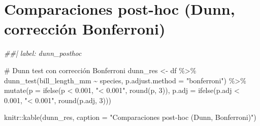 \documentclass[
  spanish,
  11pt,
  a4paper,
  DIV=11,
  numbers=noendperiod]{scrartcl}
\newenvironment{Shaded}{\begin{snugshade}}{\end{snugshade}}
\newcommand{\AttributeTok}[1]{\textcolor[rgb]{0.40,0.45,0.13}{#1}}
\newcommand{\CommentTok}[1]{\textcolor[rgb]{0.37,0.37,0.37}{#1}}
\newcommand{\DecValTok}[1]{\textcolor[rgb]{0.68,0.00,0.00}{#1}}
\newcommand{\DocumentationTok}[1]{\textcolor[rgb]{0.37,0.37,0.37}{\textit{#1}}}
\newcommand{\FloatTok}[1]{\textcolor[rgb]{0.68,0.00,0.00}{#1}}
\newcommand{\FunctionTok}[1]{\textcolor[rgb]{0.28,0.35,0.67}{#1}}
\newcommand{\NormalTok}[1]{\textcolor[rgb]{0.00,0.23,0.31}{#1}}
\newcommand{\OtherTok}[1]{\textcolor[rgb]{0.00,0.23,0.31}{#1}}
\newcommand{\SpecialCharTok}[1]{\textcolor[rgb]{0.37,0.37,0.37}{#1}}
\newcommand{\StringTok}[1]{\textcolor[rgb]{0.13,0.47,0.30}{#1}}
\begin{document}
\section{Comparaciones post-hoc (Dunn, corrección
Bonferroni)}\label{comparaciones-post-hoc-dunn-correcciuxf3n-bonferroni}

\begin{Shaded}
\begin{Highlighting}[numbers=left,,]
\DocumentationTok{\#\#| label: dunn\_posthoc}

\CommentTok{\# Dunn test con corrección Bonferroni}
\NormalTok{dunn\_res }\OtherTok{\textless{}{-}}\NormalTok{ df }\SpecialCharTok{\%\textgreater{}\%}
  \FunctionTok{dunn\_test}\NormalTok{(bill\_length\_mm }\SpecialCharTok{\textasciitilde{}}\NormalTok{ species, }\AttributeTok{p.adjust.method =} \StringTok{"bonferroni"}\NormalTok{) }\SpecialCharTok{\%\textgreater{}\%}
  \FunctionTok{mutate}\NormalTok{(}\AttributeTok{p =} \FunctionTok{ifelse}\NormalTok{(p }\SpecialCharTok{\textless{}} \FloatTok{0.001}\NormalTok{, }\StringTok{"\textless{} 0.001"}\NormalTok{, }\FunctionTok{round}\NormalTok{(p, }\DecValTok{3}\NormalTok{)),}
         \AttributeTok{p.adj =} \FunctionTok{ifelse}\NormalTok{(p.adj }\SpecialCharTok{\textless{}} \FloatTok{0.001}\NormalTok{, }\StringTok{"\textless{} 0.001"}\NormalTok{, }\FunctionTok{round}\NormalTok{(p.adj, }\DecValTok{3}\NormalTok{)))}

\NormalTok{knitr}\SpecialCharTok{::}\FunctionTok{kable}\NormalTok{(dunn\_res, }\AttributeTok{caption =} \StringTok{"Comparaciones post{-}hoc (Dunn, Bonferroni)"}\NormalTok{)}
\end{Highlighting}
\end{Shaded}
\end{document}
